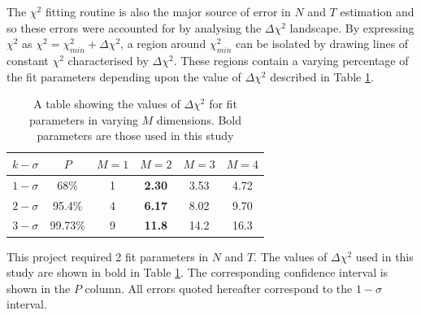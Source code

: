 \documentclass{report}
\begin{document}
The $\chi^{2}$ fitting routine is also the major source of error in $N$ and $T$ estimation and so these errors were accounted for by analysing the $\Delta \chi^{2}$ landscape. By expressing $\chi^{2}$ as $\chi^{2} = \chi^{2}_{min} + \Delta \chi^{2}$, a region around $\chi^{2}_{min}$ can be isolated by drawing lines of constant $\chi^{2}$ characterised by $\Delta \chi^{2}$. These regions contain a varying percentage of the fit parameters depending upon the value of $\Delta \chi^{2}$ described in Table \ref{table:delta}.

\begin{table}[]
\centering
\begin{tabular}{|c|c|cccc}
  \hline
  \textit{\textbf{$k -\sigma$}} & \textit{\textbf{$P$}} & \multicolumn{1}{c|}{\textit{\textbf{$M = 1$}}} & \multicolumn{1}{c|}{\textit{\textbf{$M = 2$}}} & \multicolumn{1}{c|}{\textit{\textbf{$M = 3$}}} & \multicolumn{1}{c|}{\textit{\textbf{$M = 4$}}} \\ \hline
  $1 -\sigma$                   & 68\%                  & 1                                              & \textbf{2.30}                                           & 3.53                                           & 4.72                                           \\ \cline{1-2}
  $2 -\sigma$                   & 95.4\%                & 4                                              & \textbf{6.17}                                           & 8.02                                           & 9.70                                           \\ \cline{1-2}
  $3 -\sigma$                   & 99.73\%               & 9                                              & \textbf{11.8}                                           & 14.2                                           & 16.3                                           \\ \cline{1-2}
  \end{tabular}
  \caption{A table showing the values of $\Delta \chi^{2}$ for fit parameters in varying $M$ dimensions. Bold parameters are those used in this study \parencite{recipes}}
  \label{table:delta}
\end{table}

This project required 2 fit parameters in $N$ and $T$. The values of $\Delta \chi^{2}$ used in this study are shown in bold in Table \ref{table:delta}. The corresponding confidence interval is shown in the $P$ column. All errors quoted hereafter correspond to the $1 - \sigma$ interval.
\end{document}
